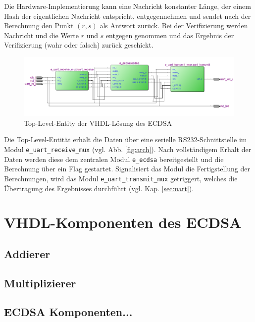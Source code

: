 Die Hardware-Implementierung kann eine Nachricht konstanter Länge, der einem Hash der eigentlichen Nachricht entspricht, entgegennehmen und sendet nach der Berechnung den Punkt $(r,s)$ als Antwort zurück. Bei der Verifizierung werden Nachricht und die Werte $r$ und $s$ entgegen genommen und das Ergebnis der Verifizierung (wahr oder falsch) zurück geschickt. \\

\begin{figure}[thb]
	\centering
  	\includegraphics[width=\textwidth]{bilder/tle}
	\caption{Top-Level-Entity der VHDL-Lösung des ECDSA}
	\label{fig:tle}
\end{figure}

Die Top-Level-Entität erhält die Daten über eine serielle RS232-Schnittstelle im Modul \texttt{e\_uart\_receive\_mux} (vgl. Abb. \ref{fig:arch}). Nach vollständigem Erhalt der Daten werden diese dem zentralen Modul \texttt{e\_ecdsa} bereitgestellt und die Berechnung über ein Flag gestartet. Signalisiert das Modul die Fertigstellung der Berechnungen, wird das Modul \texttt{e\_uart\_transmit\_mux} getriggert, welches die Übertragung des Ergebnisses durchführt (vgl. Kap. \ref{sec:uart}). \\


\section{VHDL-Komponenten des ECDSA}

\subsection{Addierer}

\subsection{Multiplizierer}

\subsection{ECDSA Komponenten...}




